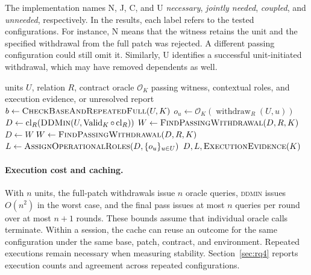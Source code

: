 \documentclass[a4paper,fleqn]{cas-sc}
\newcommand{\lab}[1]{\textsf{#1}}
\newcommand{\cl}{\operatorname{cl}}
\newcommand{\withdraw}{\operatorname{withdraw}}
\newcommand{\Valid}{\operatorname{Valid}}
\begin{document}
The implementation names \lab{N}, \lab{J}, \lab{C}, and \lab{U} \emph{necessary}, \emph{jointly needed}, \emph{coupled}, and \emph{unneeded}, respectively. In the results, each label refers to the tested configurations. For instance, \lab{N} means that the witness retains the unit and the specified withdrawal from the full patch was rejected. A different passing configuration could still omit it. Similarly, \lab{U} identifies a successful unit-initiated withdrawal, which may have removed dependents as well.

\begin{algorithm}[tbp]
\caption{Dependency-aware counterfactual triage (C3)}\label{alg:triage}
\begin{algorithmic}[1]
\Require units $U$, relation $R$, contract oracle $\mathcal{O}_K$
\Ensure passing witness, contextual roles, and execution evidence, or unresolved report
\State $b\gets\Call{CheckBaseAndRepeatedFull}{U,K}$
  \State \Return {}
\EndIf
{}
  \State $o_u\gets\mathcal{O}_K(\withdraw_R(U,u))$
\EndFor
\State $D\gets\cl_R(\Call{DDMin}{U,\Valid_K\circ\cl_R})$
\State $W\gets\Call{FindPassingWithdrawal}{D,R,K}$
\While{$W\ne\lab{none}$}
  \State $D\gets W$
  \State $W\gets\Call{FindPassingWithdrawal}{D,R,K}$
\EndWhile
\State $L\gets\Call{AssignOperationalRoles}{D,\{o_u\}_{u\in U}}$
\State \Return $D,L,\Call{ExecutionEvidence}{K}$
\end{algorithmic}
\end{algorithm}

\paragraph{Execution cost and caching.} With $n$ units, the full-patch withdrawals issue $n$ oracle queries, \textsc{ddmin} issues $O(n^2)$ in the worst case, and the final pass issues at most $n$ queries per round over at most $n+1$ rounds. These bounds assume that individual oracle calls terminate. Within a session, the cache can reuse an outcome for the same configuration under the same base, patch, contract, and environment. Repeated executions remain necessary when measuring stability. Section~\ref{sec:rq4} reports execution counts and agreement across repeated configurations.
\end{document}
